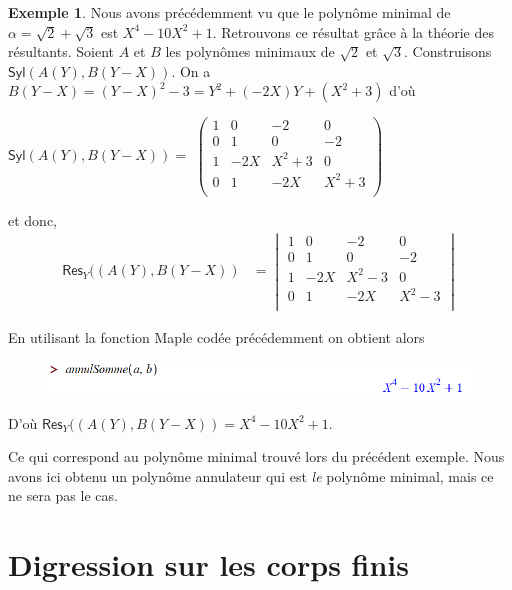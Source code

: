 \documentclass[12pt]{article}
\theoremstyle{definition}\newtheorem{defn}{Définition}
\theoremstyle{definition}\newtheorem{exm}{Exemple}
\theoremstyle{definition}\newtheorem{rem}{Remarque}
\theoremstyle{definition}\newtheorem{algo}{Algorithme}
\theoremstyle{remark}\newtheorem{exo}{Exercice}
\theoremstyle{remark}\newtheorem{nota}{Notation}
\begin{document}
\begin{exm}
Nous avons précédemment vu que le polynôme minimal de $\alpha = \sqrt2 + \sqrt3$ est $X^4 -10X^2 +1$. Retrouvons ce résultat grâce à la théorie des résultants. Soient $A$ et $B$ les polynômes minimaux de $\sqrt2$ et $\sqrt3$. Construisons $\textsf{Syl}(A(Y), B(Y-X))$. On a $B(Y-X) = (Y-X)^2 -3 = Y^2 + (-2X)Y + (X^2+3)$ d'où

\begin{center}
$\textsf{Syl}(A(Y), B(Y-X)) =$
$
   \begin{pmatrix} 
1 & 0 & -2 & 0 \\
0 & 1 & 0 & -2 \\
1 & -2X & X^2 +3 & 0 \\
0 & 1 & -2X & X^2 +3 \\
   \end{pmatrix} 
$
\end{center}

et donc,
			\begin{align*} 
\textsf{Res}_Y((A(Y), B(Y-X))&= \begin{vmatrix} 1 & 0 & -2 & 0 \\ 0 & 1 & 0 & -2 \\ 1 & -2X & X^2 - 3 & 0 \\ 0 & 1 & -2X & X^2 -3 \\\end{vmatrix}
			\end{align*} 
			
En utilisant la fonction \textsf{Maple} codée précédemment on obtient alors

\begin{figure}[h]
\includegraphics[scale=0.65]{code0.png}
\end{figure}

D'où $\textsf{Res}_Y((A(Y), B(Y-X)) = X^4 - 10X^2 + 1$.
\pagebreak

Ce qui correspond au polynôme minimal trouvé lors du précédent exemple. Nous avons ici obtenu un polynôme annulateur qui est \textit{le} polynôme minimal, mais ce ne sera pas  le cas.
\end{exm}

\section{Digression sur les corps finis}
\end{document}
